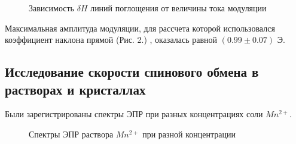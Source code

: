 \documentclass[a4paper,12pt]{article}
\theoremstyle{plain} %
\theoremstyle{definition} %
\theoremstyle{remark} %
\begin{document}
\begin{figure}[h!]
	\caption{Зависимость $\delta H$ линий поглощения от величины тока модуляции}
	\label{fig:image}
\end{figure}

\newpage

Максимальная амплитуда модуляции, для рассчета которой использовался коэффициент наклона прямой (Рис. 2.) ,
оказалась равной $(0.99 \pm 0.07)$ Э.

\subsection{Исследование скорости спинового обмена в растворах и кристаллах}
Были зарегистрированы спектры ЭПР при разных концентрациях соли $Mn^{2+}$. 


\begin{figure}[h!]
	\caption{Спектры ЭПР раствора $Mn^{2+}$ при разной концентрации}
	\label{fig:image}
\end{figure}
\end{document}
